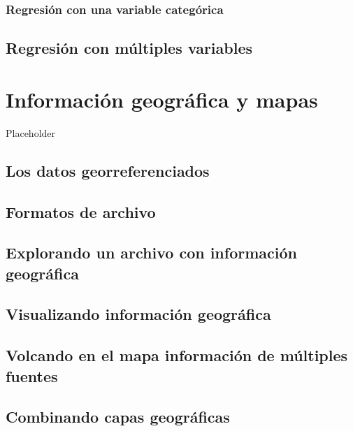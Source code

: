 \documentclass[]{book}
\begin{document}
\subsection{Regresión con una variable
categórica}\label{regresion-con-una-variable-categorica}

\section{Regresión con múltiples
variables}\label{regresion-con-multiples-variables}

\chapter{Información geográfica y
mapas}\label{informacion-geografica-y-mapas}

Placeholder

\section{Los datos georreferenciados}\label{los-datos-georreferenciados}

\section{Formatos de archivo}\label{formatos-de-archivo}

\section{Explorando un archivo con información
geográfica}\label{explorando-un-archivo-con-informacion-geografica}

\section{Visualizando información
geográfica}\label{visualizando-informacion-geografica}

\section{Volcando en el mapa información de múltiples
fuentes}\label{volcando-en-el-mapa-informacion-de-multiples-fuentes}

\section{Combinando capas
geográficas}\label{combinando-capas-geograficas}


\end{document}
